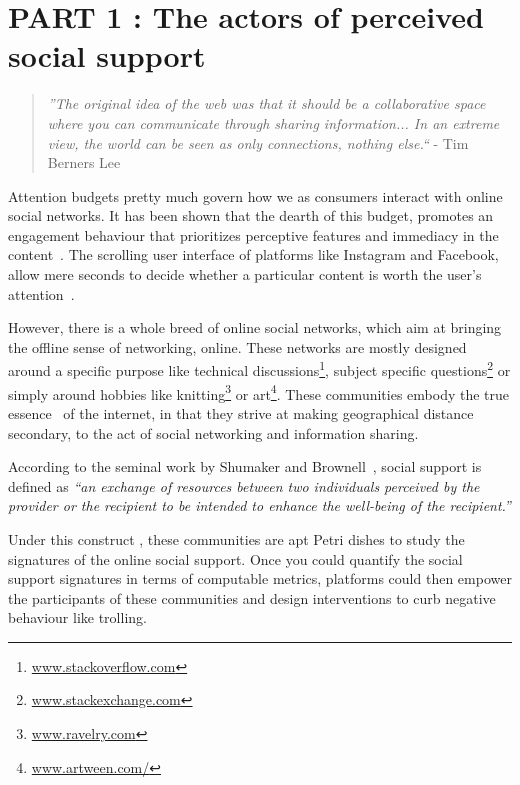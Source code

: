 
\chapter{PART 1 : The actors of perceived social support }

\label{chap:Utility_support}
\graphicspath{{Chapter2/plots/} {Chapter2/plots}}
\begin{quote}
    \textit{''The original idea of the web was that it should be a collaborative space where you can communicate through sharing information... In an extreme view, the world can be seen as only connections, nothing else.``} - Tim Berners Lee\cite{berners2001weaving} 
\end{quote}
Attention budgets pretty much govern how we as consumers interact with online social networks. It has been shown that the dearth of this budget, promotes an engagement behaviour that prioritizes perceptive features and immediacy in the content~\cite{joglekar2017like}. The scrolling user interface of platforms like Instagram and Facebook, allow mere seconds to decide whether a particular content is worth the user's attention~\cite{eikelboom2017irresistible}. 

However, there is a whole breed of online social networks, which aim at bringing the offline sense of networking, online. These networks are mostly designed around a specific purpose like technical discussions\footnote{\url{www.stackoverflow.com}}, subject specific questions\footnote{\url{www.stackexchange.com}} or simply around hobbies like knitting\footnote{\url{www.ravelry.com}} or art\footnote{\url{www.artween.com/}}. These communities embody the true essence~\cite{berners2001weaving} of the internet, in that they strive at making geographical distance secondary, to the act of social networking and information sharing.
\begin{definition}
    According to the seminal work by Shumaker and Brownell~\cite{shumaker1984toward}, social support is defined as \textsl{``an exchange of resources between two individuals perceived by the provider or the recipient to be intended to enhance the well-being of the recipient.''}
    \label{def:support}
\end{definition}

Under this construct , these communities are apt Petri dishes to study the signatures of the online social support. Once you could quantify the social support signatures in terms of computable metrics, platforms could then empower the participants of these communities and design interventions to curb negative behaviour like trolling.


